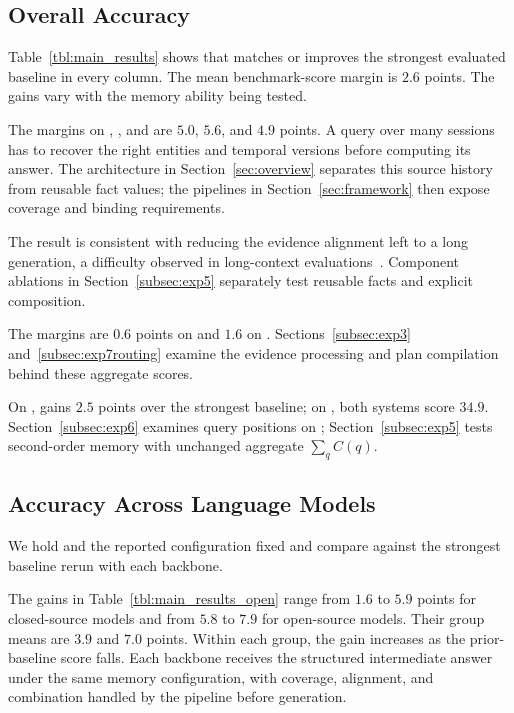 

\subsection{Overall Accuracy}
\label{subsec:exp1}

Table~\ref{tbl:main_results} shows that \sys{} matches or improves the
strongest evaluated baseline in every column. The mean benchmark-score
margin is $2.6$ points.
The gains vary with the memory ability being tested.

The margins on \lmeo{}, \lmes{}, and \lmem{} are $5.0$, $5.6$, and
$4.9$ points. A query over many sessions has to recover the right
entities and temporal versions before computing its answer.
The architecture in Section~\ref{sec:overview} separates this source
history from reusable fact values; the pipelines in
Section~\ref{sec:framework} then expose coverage and binding requirements.

The result is consistent with reducing the evidence alignment left to
a long generation, a difficulty observed in long-context
evaluations~\cite{longcontext,ruler}. Component ablations in
Section~\ref{subsec:exp5} separately test reusable facts and explicit
composition.

The margins are $0.6$ points on \locomo{} and $1.6$ on \membench{}.
Sections~\ref{subsec:exp3} and~\ref{subsec:exp7routing} examine the
evidence processing and plan compilation behind these aggregate scores.

On \evomem{}, \sys{} gains $2.5$ points over the strongest baseline;
on \dynamicmem{}, both systems score $34.9$.
Section~\ref{subsec:exp6} examines query positions on \evomem{};
Section~\ref{subsec:exp5} tests second-order memory with unchanged
aggregate $\sum_q C(q)$.

\subsection{Accuracy Across Language Models}
\label{subsec:exp2}

We hold \membench{} and the reported configuration fixed and compare
against the strongest baseline rerun with each backbone.



The gains in Table~\ref{tbl:main_results_open} range from $1.6$ to
$5.9$ points for closed-source models and from $5.8$ to $7.9$ for
open-source models. Their group means are $3.9$ and $7.0$ points.
Within each group, the gain increases as the prior-baseline score falls.
Each backbone receives the structured intermediate answer under the
same memory configuration, with coverage, alignment, and combination
handled by the pipeline before generation.

